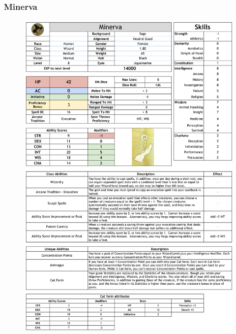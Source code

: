 \subsubsection*{Minerva}
\begin{figure}[H]
\includegraphics[max width=\textwidth]{../Pictures/Characters/Stat_sheets/Minerva_sheet.png}
\end{figure}

